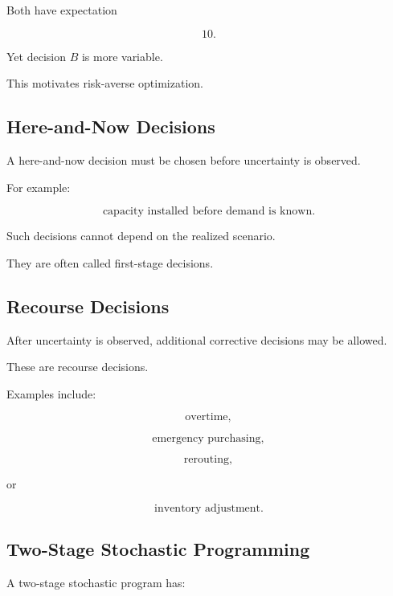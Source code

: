Both have expectation

\[
\boxed{
10.
}
\]

Yet decision \(B\) is more variable.

This motivates risk-averse optimization.

\subsection{Here-and-Now Decisions}
\label{subsec:here-and-now-decisions}

A here-and-now decision must be chosen before uncertainty is observed.

For example:

\[
\boxed{
\text{capacity installed before demand is known}.
}
\]

Such decisions cannot depend on the realized scenario.

They are often called first-stage decisions.

\subsection{Recourse Decisions}
\label{subsec:recourse-decisions}

After uncertainty is observed, additional corrective decisions may be
allowed.

These are recourse decisions.

Examples include:

\[
\boxed{
\text{overtime},
}
\]

\[
\boxed{
\text{emergency purchasing},
}
\]

\[
\boxed{
\text{rerouting},
}
\]

or

\[
\boxed{
\text{inventory adjustment}.
}
\]

\subsection{Two-Stage Stochastic Programming}
\label{subsec:two-stage-stochastic-programming}

A two-stage stochastic program has:

